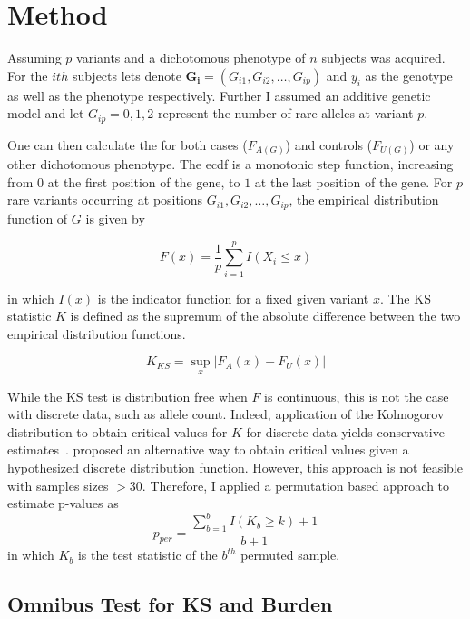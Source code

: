 \section{Method}
\label{sec:method}

Assuming $p$ variants and a dichotomous phenotype of $n$ subjects was acquired.
For the $ith$ subjects lets denote $\bm{G_i} = (G_{i1}, G_{i2},\ldots , G_{ip})$ and $y_i$ as the genotype as well as the phenotype respectively.
Further I assumed an additive genetic model and let $G_{ip} = 0, 1, 2$ represent the number of rare alleles at variant $p$.  

One can then calculate the  for both cases ($F_{A(G)}$) and controls ($F_{U(G)}$) or any other dichotomous phenotype.
The ecdf is a monotonic step function, increasing from $0$ at the first position of the gene, to $1$ at the last position of the gene.
For $p$ rare variants occurring at positions  $G_{i1}, G_{i2}, \ldots, G_{ip}$, the empirical distribution function of $G$ is given by

\begin{equation}
  F(x) = \frac{1}{p}\sum^p_{i=1}I(X_i \leq x)
\end{equation}

in which $I(x)$ is the indicator function for a fixed given variant $x$.
The KS statistic $K$ is defined as the supremum of the absolute difference between the two empirical distribution functions.

\begin{equation}
	K_{KS} = \sup_x | F_A(x) - F_U(x) |
\end{equation}

While the KS test is distribution free when $F$ is continuous, this is not the case with discrete data, such as allele count.
Indeed, application of the Kolmogorov distribution to obtain critical values for $K$ for discrete data yields conservative estimates~\cite{Walsh1963,Conover1972}. 
\citet{Conover1972} proposed an alternative way to obtain critical values given a hypothesized discrete distribution function.
However, this approach is not feasible with samples sizes $>30$.
Therefore, I applied a permutation based approach to estimate p-values as 
\begin{equation}
  p_{per} = \frac{\sum^b_{b=1} I(K_b \geq k)+1}{b+1}
\end{equation}
in which $K_b$ is the test statistic of the $b^{th}$ permuted sample.

\subsection{Omnibus Test for KS and Burden}
\label{sub:omnibus_test_for_ks_and_burden}

